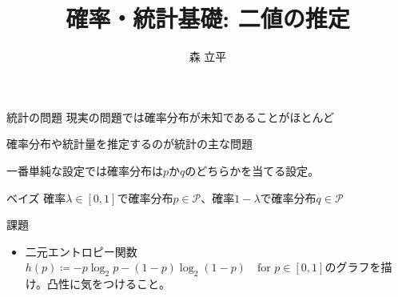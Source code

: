 \documentclass[lualatex,handout]{beamer}
\title{確率・統計基礎: 二値の推定}
\author{森 立平}
\date{}
\newcommand\KL[2]{D\left(#1\,\|\,#2\right)}
\theoremstyle{definition}
\begin{document}
\begin{frame}[plain]
\maketitle
\end{frame}


\begin{frame}{統計の問題}
現実の問題では確率分布が未知であることがほとんど

\vspace{2em}
確率分布や統計量を推定するのが統計の主な問題

\vspace{2em}
一番単純な設定では確率分布は$p$か$q$のどちらかを当てる設定。
\end{frame}

\begin{frame}{ベイズ}
確率$\lambda\in[0,1]$で確率分布$p\in\mathcal{P}$、確率$1-\lambda$で確率分布$q\in\mathcal{P}$
\end{frame}

\begin{frame}{課題}
\begin{itemize}
\item 二元エントロピー関数$h(p)\coloneq -p\log_2 p - (1-p)\log_2(1-p)\quad\text{for } p\in[0,1]$のグラフを描け。凸性に気をつけること。
\end{itemize}
\end{frame}
\end{document}
